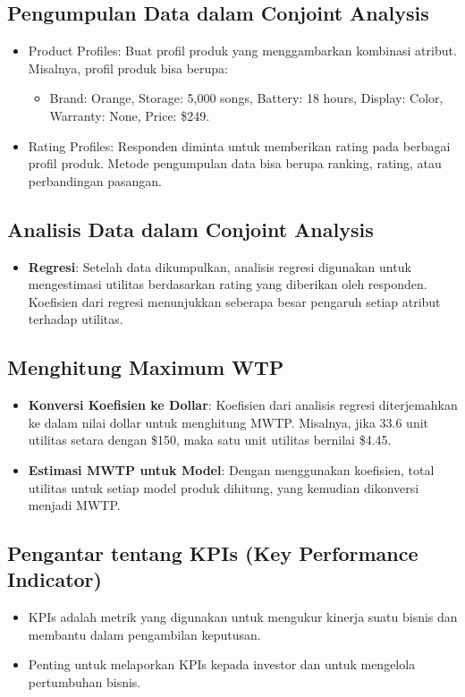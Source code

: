 \documentclass{article}
\begin{document}
\subsection{Pengumpulan Data dalam Conjoint Analysis}
\begin{itemize}
    \item Product Profiles: Buat profil produk yang menggambarkan kombinasi atribut. Misalnya, profil produk bisa berupa:
          \begin{itemize}
              \item Brand: Orange, Storage: 5,000 songs, Battery: 18 hours, Display: Color, Warranty: None, Price: \$249.
          \end{itemize}
    \item Rating Profiles: Responden diminta untuk memberikan rating pada berbagai profil produk. Metode pengumpulan data bisa berupa ranking, rating, atau perbandingan pasangan.
\end{itemize}

\subsection{Analisis Data dalam Conjoint Analysis}
\begin{itemize}
    \item \textbf{Regresi}: Setelah data dikumpulkan, analisis regresi digunakan untuk mengestimasi utilitas berdasarkan rating yang diberikan oleh responden. Koefisien dari regresi menunjukkan seberapa besar pengaruh setiap atribut terhadap utilitas.
\end{itemize}

\subsection{Menghitung Maximum WTP}
\begin{itemize}
    \item \textbf{Konversi Koefisien ke Dollar}: Koefisien dari analisis regresi diterjemahkan ke dalam nilai dollar untuk menghitung MWTP. Misalnya, jika 33.6 unit utilitas setara dengan \$150, maka satu unit utilitas bernilai \$4.45.
    \item \textbf{Estimasi MWTP untuk Model}: Dengan menggunakan koefisien, total utilitas untuk setiap model produk dihitung, yang kemudian dikonversi menjadi MWTP.
\end{itemize}

\subsection{Pengantar tentang KPIs (Key Performance Indicator)}
\begin{itemize}
    \item KPIs adalah metrik yang digunakan untuk mengukur kinerja suatu bisnis dan membantu dalam pengambilan keputusan.
    \item Penting untuk melaporkan KPIs kepada investor dan untuk mengelola pertumbuhan bisnis.
\end{itemize}
\end{document}
